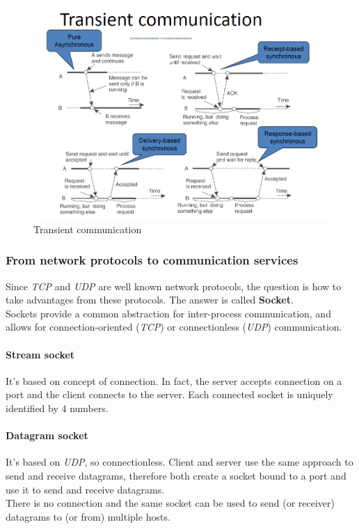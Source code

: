 \begin{figure}[h]
    \caption{Transient communication}
    \includegraphics[width=\textwidth]{src/images/transient-communication.png}
    \centering
\end{figure}

\subsubsection{From network protocols to communication services}

Since \textit{TCP} and \textit{UDP} are well known network protocols, the question is how to take advantages from these protocols. The answer is called \textbf{Socket}.\\
Sockets provide a common abstraction for inter-process communication, and allows for connection-oriented (\textit{TCP}) or connectionless (\textit{UDP}) communication.

\paragraph{Stream socket}

It's based on concept of connection. In fact, the server accepts connection on a port and the client connects to the server. Each connected socket is uniquely identified by 4 numbers.

\paragraph{Datagram socket}

It's based on \textit{UDP}, so connectionless. Client and server use the same approach to send and receive datagrams, therefore both create a socket bound to a port and use it to send and receive datagrams.\\
There is no connection and the same socket can be used to send (or receiver) datagrams to (or from) multiple hosts.


